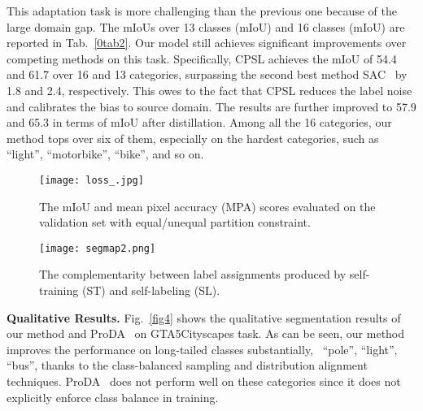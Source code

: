 \documentclass[10pt,twocolumn,letterpaper]{article}
\begin{document}
	\vspace{0.1em} This adaptation task is more challenging than the previous one because of the large domain gap. The mIoUs over 13 classes (mIoU) and 16 classes (mIoU) are reported in Tab.~\ref{0tab2}. Our model still achieves significant improvements over competing methods on this task. Specifically, CPSL achieves the mIoU of 54.4 and 61.7 over 16 and 13 categories, surpassing the second best method SAC~\cite{araslanov2021self} by 1.8 and 2.4, respectively. This owes to the fact that CPSL reduces the label noise and calibrates the bias to source domain. The results are further improved to 57.9 and 65.3 in terms of mIoU after distillation. Among all the 16 categories, our method tops over six of them, especially on the hardest categories, such as ``light'', ``motorbike'', ``bike'', and so on. 


	\begin{figure}
		\vspace{-0.6em}\hspace{-0.8em}
		\texttt{[image: loss\_.jpg]}\\
		\vspace{-2.5em}
		\caption{The mIoU and mean pixel accuracy (MPA) scores evaluated on the validation set with equal/unequal partition constraint.}
		\label{fig7}
		\vspace{-1em}
	\end{figure}
	
	\begin{figure*}
		\centering \vspace{-1.5em}
		\texttt{[image: segmap2.png]}\\
		\vspace{-1.5em}
		\caption{The complementarity between label assignments produced by self-training (ST) and self-labeling (SL).}
		\label{fig3}
		\vspace{-1em}
	\end{figure*}
	
	\vspace{0.2em}	\noindent\textbf{Qualitative Results.}
	Fig.~\ref{fig4} shows the qualitative segmentation results of our method and ProDA~\cite{zhang2021prototypical} on GTA5Cityscapes task. As can be seen, our method improves the performance on long-tailed classes substantially, \eg~``pole'', ``light'', ``bus'', thanks to the class-balanced sampling and distribution alignment techniques. ProDA~\cite{zhang2021prototypical} does not perform well on these categories since it does not explicitly enforce class balance in training. 
\end{document}
